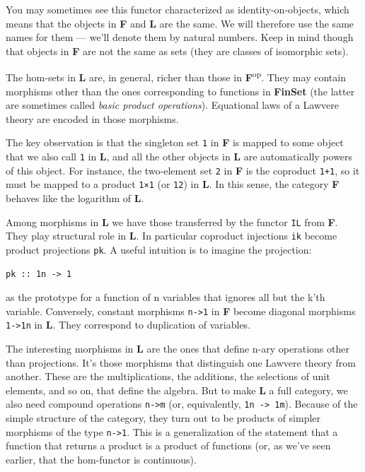 You may sometimes see this functor characterized as identity-on-objects,
which means that the objects in \textbf{F} and \textbf{L} are the same.
We will therefore use the same names for them --- we'll denote them by
natural numbers. Keep in mind though that objects in \textbf{F} are not
the same as sets (they are classes of isomorphic sets).

The hom-sets in \textbf{L} are, in general, richer than those in
\textbf{F}\textsuperscript{op}. They may contain morphisms other than
the ones corresponding to functions in \textbf{FinSet} (the latter are
sometimes called \emph{basic product operations}). Equational laws of a
Lawvere theory are encoded in those morphisms.

The key observation is that the singleton set \texttt{1} in \textbf{F}
is mapped to some object that we also call \texttt{1} in \textbf{L}, and
all the other objects in \textbf{L} are automatically powers of this
object. For instance, the two-element set \texttt{2} in \textbf{F} is
the coproduct \texttt{1+1}, so it must be mapped to a product
\texttt{1×1} (or \texttt{12}) in \textbf{L}. In this sense, the category
\textbf{F} behaves like the logarithm of \textbf{L}.

Among morphisms in \textbf{L} we have those transferred by the functor
\texttt{IL} from \textbf{F}. They play structural role in \textbf{L}. In
particular coproduct injections \texttt{ik} become product projections
\texttt{pk}. A useful intuition is to imagine the projection:

\begin{verbatim}
pk :: 1n -> 1
\end{verbatim}

as the prototype for a function of n variables that ignores all but the
k'th variable. Conversely, constant morphisms \texttt{n-\textgreater{}1}
in \textbf{F} become diagonal morphisms \texttt{1-\textgreater{}1n} in
\textbf{L}. They correspond to duplication of variables.

The interesting morphisms in \textbf{L} are the ones that define n-ary
operations other than projections. It's those morphisms that distinguish
one Lawvere theory from another. These are the multiplications, the
additions, the selections of unit elements, and so on, that define the
algebra. But to make \textbf{L} a full category, we also need compound
operations \texttt{n-\textgreater{}m} (or, equivalently,
\texttt{1n\ -\textgreater{}\ 1m}). Because of the simple structure of
the category, they turn out to be products of simpler morphisms of the
type \texttt{n-\textgreater{}1}. This is a generalization of the
statement that a function that returns a product is a product of
functions (or, as we've seen earlier, that the hom-functor is
continuous).

